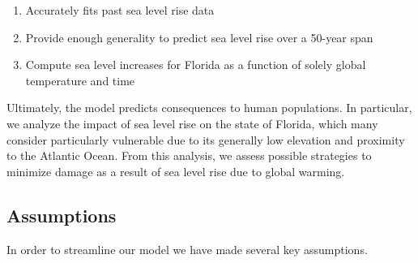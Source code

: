 \documentclass[12pt,a4paper,titlepage]{article}
\begin{document}
\begin{enumerate}

\item Accurately fits past sea level rise data

\item Provide enough generality to predict sea level rise over a
50-year span

\item Compute sea level increases for Florida as a function of
solely global temperature and time

\end{enumerate}

Ultimately, the model predicts consequences to human populations.
In particular, we analyze the impact of sea level rise on the
state of Florida, which many consider particularly vulnerable due
to its generally low elevation and proximity to the Atlantic
Ocean. From this analysis, we assess possible strategies to
minimize damage as a result of sea level rise due to global
warming.

\subsection{Assumptions}

In order to streamline our model we have made several key
assumptions.
\end{document}
